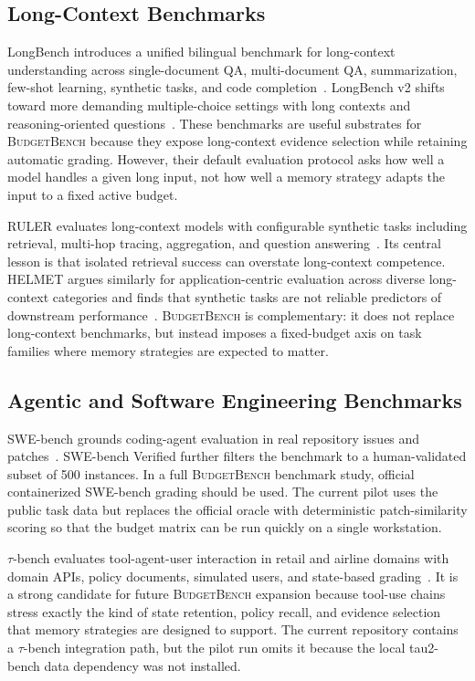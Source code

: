 \documentclass[11pt]{article}
\newcommand{\BudgetBench}{\textsc{BudgetBench}}
\begin{document}
\subsection{Long-Context Benchmarks}

LongBench introduces a unified bilingual benchmark for long-context
understanding across single-document QA, multi-document QA, summarization,
few-shot learning, synthetic tasks, and code completion~\citep{bai2023longbench}.
LongBench v2 shifts toward more demanding multiple-choice settings with long
contexts and reasoning-oriented questions~\citep{bai2024longbenchv2}.  These
benchmarks are useful substrates for \BudgetBench{} because they expose
long-context evidence selection while retaining automatic grading.  However,
their default evaluation protocol asks how well a model handles a given long
input, not how well a memory strategy adapts the input to a fixed active
budget.

RULER evaluates long-context models with configurable synthetic tasks including
retrieval, multi-hop tracing, aggregation, and question
answering~\citep{hsieh2024ruler}.  Its central lesson is that isolated retrieval success
can overstate long-context competence.  HELMET argues similarly for
application-centric evaluation across diverse long-context categories and
finds that synthetic tasks are not reliable predictors of downstream
performance~\citep{yen2024helmet}.  \BudgetBench{} is complementary: it does
not replace long-context benchmarks, but instead imposes a fixed-budget axis
on task families where memory strategies are expected to matter.

\subsection{Agentic and Software Engineering Benchmarks}

SWE-bench grounds coding-agent evaluation in real repository issues and
patches~\citep{jimenez2023swebench}.  SWE-bench Verified further filters the
benchmark to a human-validated subset of 500 instances.  In a full
\BudgetBench{} benchmark study, official containerized SWE-bench grading should
be used.
The current pilot uses the public task data but replaces the official oracle
with deterministic patch-similarity scoring so that the budget matrix can be
run quickly on a single workstation.

$\tau$-bench evaluates tool-agent-user interaction in retail and airline
domains with domain APIs, policy documents, simulated users, and state-based
grading~\citep{yao2024taubench}.  It is a strong candidate for future
\BudgetBench{} expansion because tool-use chains stress exactly the kind of
state retention, policy recall, and evidence selection that memory strategies
are designed to support.  The current repository contains a $\tau$-bench
integration path, but the pilot run omits it because the local tau2-bench data
dependency was not installed.
\end{document}
